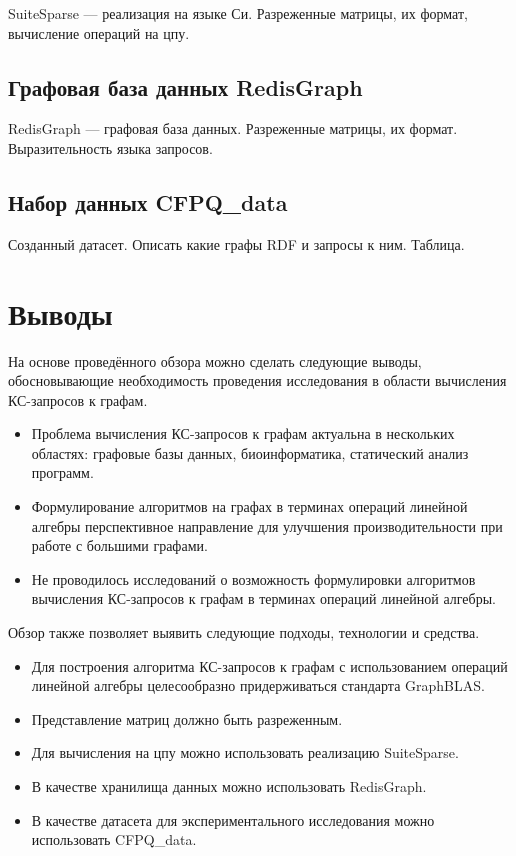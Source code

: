 SuiteSparse --- реализация на языке Си. Разреженные матрицы, их формат, вычисление операций на цпу.

\subsection{Графовая база данных RedisGraph}
RedisGraph --- графовая база данных. Разреженные матрицы, их формат. Выразительность языка запросов.

\subsection{Набор данных CFPQ\_data}
Созданный датасет. Описать какие графы RDF и запросы к ним. Таблица.

\section{Выводы}\label{sec:ch1/sec6}
На основе проведённого обзора можно сделать следующие выводы, обосновывающие необходимость проведения исследования в области вычисления КС-запросов к графам.
\begin{itemize}
	\item Проблема вычисления КС-запросов к графам актуальна в нескольких областях: графовые базы данных, биоинформатика, статический анализ программ.
	\item Формулирование алгоритмов на графах в терминах операций линейной алгебры перспективное направление для улучшения производительности при работе с большими графами.
	\item Не проводилось исследований о возможность формулировки алгоритмов вычисления КС-запросов к графам в терминах операций линейной алгебры.
\end{itemize}

Обзор также позволяет выявить следующие подходы, технологии и средства.
\begin{itemize}
	\item Для построения алгоритма КС-запросов к графам с использованием операций линейной алгебры целесообразно придерживаться стандарта GraphBLAS.
	\item Представление матриц должно быть разреженным.
	\item Для вычисления на цпу можно использовать реализацию SuiteSparse.
	\item В качестве хранилища данных можно использовать RedisGraph.
	\item В качестве датасета для экспериментального исследования можно использовать CFPQ\_data.
\end{itemize}


\FloatBarrier
